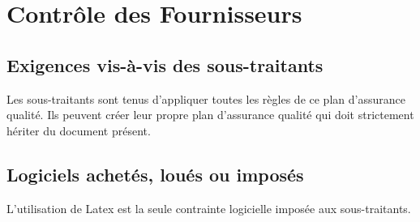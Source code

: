 \section{Contrôle des Fournisseurs}

\subsection{Exigences vis-à-vis des sous-traitants}
Les sous-traitants sont tenus d'appliquer toutes les règles de ce plan d'assurance qualité.
Ils peuvent créer leur propre plan d'assurance qualité qui doit strictement hériter du document présent.
\subsection{Logiciels achetés, loués ou imposés}
L'utilisation de Latex est la seule contrainte logicielle imposée aux sous-traitants.
\pagebreak
